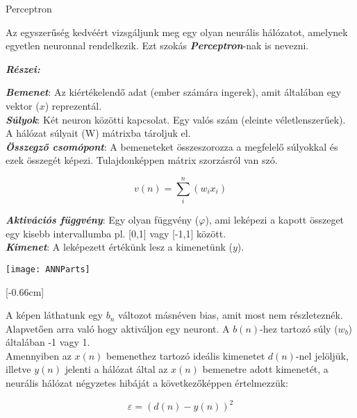 \begin{flushleft}
{\Large Perceptron}\\
\end{flushleft}

Az egyszerűség kedvéért vizsgáljunk meg egy olyan neurális hálózatot, amelynek egyetlen neuronnal rendelkezik. Ezt szokás \textbf{\textit{Perceptron}}-nak is nevezni.

\begin{flushleft}
\textit{\textbf{{\large Részei:}}}
\end{flushleft}

\textbf{\textit{Bemenet}}: Az kiértékelendő adat (ember számára ingerek), amit általában egy vektor (\(x\)) reprezentál.\\

\textit{\textbf{Súlyok}}: Két neuron közötti kapcsolat. Egy valós szám (eleinte véletlenszerűek). A hálózat súlyait (W) mátrixba tároljuk el.\\

\textbf{\textit{Összegző csomópont}}: A bemeneteket összeszorozza a megfelelő súlyokkal és ezek összegét képezi. Tulajdonképpen mátrix szorzásról van szó.

\[v(n) = \sum_i^{n}(w_ix_i)\]

\textit{\textbf{Aktivációs függvény}}: Egy olyan függvény ($\varphi$), ami leképezi a kapott összeget egy kisebb intervallumba pl. [0,1] vagy [-1,1] között.\\

\textbf{\textit{Kimenet}}: A leképezett értékünk lesz a kimenetünk (\(y\)).\\

\begin{center}
	\texttt{[image: ANNParts]}
\end{center}

[-0.66cm]

A képen láthatunk egy \(b_n\) változot másnéven bias, amit most nem részleteznék. Alapvetően arra való hogy aktiváljon egy neuront. A \(b(n)\)-hez tartozó súly (\(w_b\)) általában -1 vagy 1.\\

Amennyiben az \(x(n)\) bemenethez tartozó ideális kimenetet \(d(n)\)-nel jelöljük, illetve \(y(n)\) jelenti a hálózat által az \(x(n)\) bemenetre adott kimenetét, a neurális hálózat négyzetes hibáját a következőképpen értelmezzük:

\[ \varepsilon = (d(n) - y(n))^2\]

